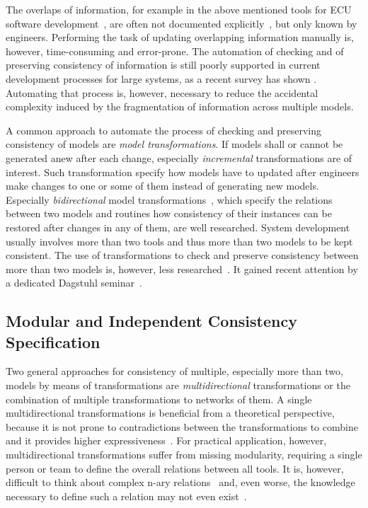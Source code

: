 The overlaps of information, for example in the above mentioned tools for \gls{ECU} software development~\cite{giese2010a}, are often not documented explicitly~\cite{mazkatli2017ase}, but only known by engineers.
Performing the task of updating overlapping information manually is, however, time-consuming and error-prone.
The automation of checking and of preserving consistency of information is still poorly supported in current development processes for large systems, as a recent survey has shown .
Automating that process is, however, necessary to reduce the accidental complexity induced by the fragmentation of information across multiple models.

A common approach to automate the process of checking and preserving consistency of models are \emph{model transformations}.
If models shall or cannot be generated anew after each change, especially \emph{incremental} transformations are of interest.
Such transformation specify how models have to updated after engineers make changes  to one or some of them instead of generating new models.
Especially \emph{bidirectional} model transformations~\cite{stevens2010sosym}, which specify the relations between two models and routines how consistency of their instances can be restored after changes in any of them, are well researched.
System development usually involves more than two tools and thus more than two models to be kept consistent.
The use of transformations to check and preserve consistency between more than two models is, however, less researched~\cite{stevens2020BidirectionalTransformationLargeSoSym}.
It gained recent attention by a dedicated Dagstuhl seminar~\cite{cleve2019dagstuhl}.


\subsection{Modular and Independent Consistency Specification}

Two general approaches for consistency of multiple, especially more than two, models by means of transformations are \emph{multidirectional} transformations or the combination of multiple transformations to networks of them.
A single multidirectional transformations is beneficial from a theoretical perspective, because it is not prone to contradictions between the transformations to combine and it provides higher expressiveness~\cite{stevens2020BidirectionalTransformationLargeSoSym}.
For practical application, however, multidirectional transformations suffer from missing modularity, requiring a single person or team to define the overall relations between all tools.
It is, however, difficult to think about complex n-ary relations~\cite{stevens2020BidirectionalTransformationLargeSoSym} and, even worse, the knowledge necessary to define such a relation may not even exist~.


